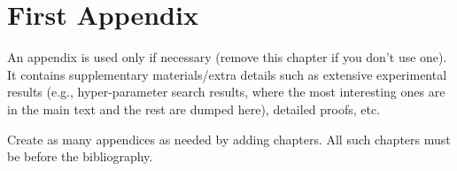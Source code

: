 \documentclass{report}
\begin{document}
\appendix

\chapter{First Appendix}

An appendix is used only if necessary (remove this chapter if you don't use one). It contains supplementary materials/extra details such as extensive experimental results (e.g., hyper-parameter search results, where the most interesting ones are in the main text and the rest are dumped here), detailed proofs, etc. 

Create as many appendices as needed by adding chapters. All such chapters must be before the bibliography. 
\fi



\end{document}
